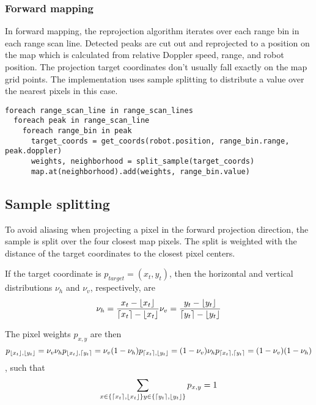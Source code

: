 \subsubsection{Forward mapping}\label{forward-mapping}

In forward mapping, the reprojection algorithm iterates over each range
bin in each range scan line. Detected peaks are cut out and reprojected
to a position on the map which is calculated from relative Doppler
speed, range, and robot position. The projection target coordinates
don't usually fall exactly on the map grid points. The implementation
uses sample splitting to distribute a value over the nearest pixels in
this case.

\begin{verbatim}
foreach range_scan_line in range_scan_lines
  foreach peak in range_scan_line
    foreach range_bin in peak
      target_coords = get_coords(robot.position, range_bin.range, peak.doppler)
      weights, neighborhood = split_sample(target_coords)
      map.at(neighborhood).add(weights, range_bin.value)
\end{verbatim}

\subsection{Sample splitting}\label{sample-splitting}

To avoid aliasing when projecting a pixel in the forward projection
direction, the sample is split over the four closest map pixels. The
split is weighted with the distance of the target coordinates to the
closest pixel centers.

If the target coordinate is \(p_{target}=(x_t, y_t)\), then the
horizontal and vertical distributions \(\nu_h\) and \(\nu_v\),
respectively, are \[
\nu_h = \frac{x_t - \lfloor x_t \rfloor}{\lceil x_t \rceil - \lfloor x_t \rfloor} \\
\nu_v = \frac{y_t - \lfloor y_t \rfloor}{\lceil y_t \rceil - \lfloor y_t \rfloor}
\]

The pixel weights \(p_{x,y}\) are then \[
p_{\lfloor x_t \rfloor, \lfloor y_t \rfloor} = \nu_v \nu_h\\
p_{\lfloor x_t \rfloor, \lceil y_t \rceil} = \nu_v (1 - \nu_h)\\
p_{\lceil x_t \rceil, \lfloor y_t \rfloor} =  (1 - \nu_v) \nu_h\\
p_{\lceil x_t \rceil, \lceil y_t \rceil} = (1 - \nu_v) (1 - \nu_h)
\] , such that \[
\sum\limits_{
x \in \{\lceil x_t \rceil, \lfloor x_t \rfloor\}\\
y \in \{\lceil y_t \rceil, \lfloor y_t \rfloor\}
} p_{x,y} = 1
\]

